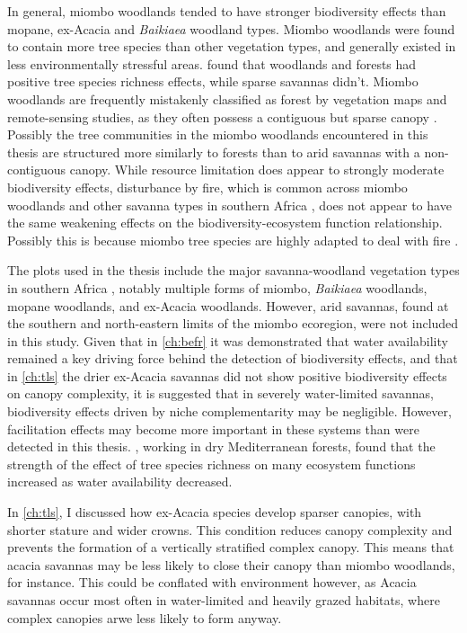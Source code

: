 \begin{refsection}
In general, miombo woodlands tended to have stronger biodiversity effects than mopane, ex-Acacia and \textit{Baikiaea} woodland types. Miombo woodlands were found to contain more tree species than other vegetation types, and generally existed in less environmentally stressful areas. \citet{Mensah2020} found that woodlands and forests had positive tree species richness effects, while sparse savannas didn't. Miombo woodlands are frequently mistakenly classified as forest by vegetation maps and remote-sensing studies, as they often possess a contiguous but sparse canopy \citep{}. Possibly the tree communities in the miombo woodlands encountered in this thesis are structured more similarly to forests than to arid savannas with a non-contiguous canopy. While resource limitation does appear to strongly moderate biodiversity effects, disturbance by fire, which is common across miombo woodlands and other savanna types in southern Africa \citep{}, does not appear to have the same weakening effects on the biodiversity-ecosystem function relationship. Possibly this is because miombo tree species are highly adapted to deal with fire \citep{}. 

The plots used in the thesis include the major savanna-woodland vegetation types in southern Africa \citep{}, notably multiple forms of miombo, \textit{Baikiaea} woodlands, mopane woodlands, and ex-Acacia woodlands. However, arid savannas, found at the southern and north-eastern limits of the miombo ecoregion, were not included in this study. Given that in \autoref{ch:befr} it was demonstrated that water availability remained a key driving force behind the detection of biodiversity effects, and that in \autoref{ch:tls} the drier ex-Acacia savannas did not show positive biodiversity effects on canopy complexity, it is suggested that in severely water-limited savannas, biodiversity effects driven by niche complementarity may be negligible. However, facilitation effects may become more important in these systems than were detected in this thesis. \citet{Ratcliffe2017}, working in dry Mediterranean forests, found that the strength of the effect of tree species richness on many ecosystem functions increased as water availability decreased. 

In \autoref{ch:tls}, I discussed how ex-Acacia species develop sparser canopies, with shorter stature and wider crowns. This condition reduces canopy complexity and prevents the formation of a vertically stratified complex canopy. This means that acacia savannas may be less likely to close their canopy than miombo woodlands, for instance. This could be conflated with environment however, as Acacia savannas occur most often in water-limited and heavily grazed habitats, where complex canopies arwe less likely to form anyway.


\end{refsection}
